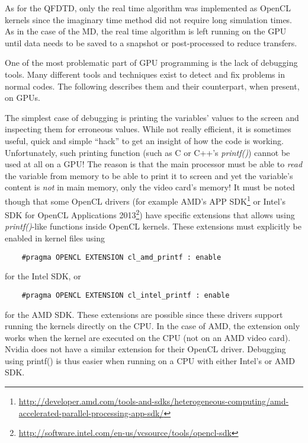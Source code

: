As for the QFDTD, only the real time algorithm was implemented as OpenCL
kernels since the imaginary time method did not require long simulation times.
As in the case of the MD, the real time algorithm is left running on the GPU
until data needs to be saved to a snapshot or post-processed to reduce
transfers.




One of the most problematic part of GPU programming is the lack of debugging
tools. Many different tools and techniques exist to detect and fix problems in
normal codes. The following describes them and their counterpart, when present,
on GPUs.



The simplest case of debugging is printing the variables' values to the screen
and inspecting them for
erroneous values. While not really efficient, it is sometimes useful, quick
and simple ``hack'' to get an insight of how the code is working. Unfortunately,
such printing function (such as C or C++'s \textit{printf()}) cannot be used at
all on a GPU! The reason is that the main processor must be able to
\textit{read} the variable from memory to be able to print it to screen and yet
the variable's content is \textit{not} in main memory, only the video card's
memory! It must be noted though that some OpenCL drivers (for example AMD's
APP SDK\footnote{\url{http://developer.amd.com/tools-and-sdks/heterogeneous-computing/amd-accelerated-parallel-processing-app-sdk/}}
or Intel's SDK for OpenCL Applications
2013\footnote{\url{http://software.intel.com/en-us/vcsource/tools/opencl-sdk}})
have specific extensions that allows using \textit{printf()}-like functions
inside OpenCL kernels. These extensions must explicitly be enabled in kernel
files using
\begin{verbatim}
    #pragma OPENCL EXTENSION cl_amd_printf : enable
\end{verbatim}
for the Intel SDK, or
\begin{verbatim}
    #pragma OPENCL EXTENSION cl_intel_printf : enable
\end{verbatim}
for the AMD SDK. These extensions are possible since these drivers support
running the kernels directly on the CPU. In the case of AMD, the extension only
works when the kernel are executed on the CPU (not on an AMD video card). Nvidia
does not have a similar extension for their OpenCL driver. Debugging using
printf() is thus easier when running on a CPU with either Intel's or AMD SDK.


